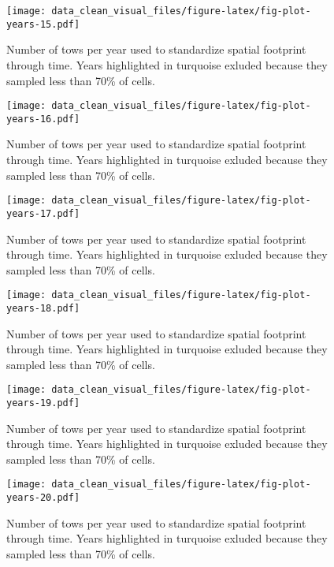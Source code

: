 \documentclass[
]{article}
\begin{document}
\begin{figure}
\centering
\texttt{[image: data\_clean\_visual\_files/figure-latex/fig-plot-years-15.pdf]}
\caption{\label{fig:fig-plot-years-15}Number of tows per year used to standardize spatial footprint through time. Years highlighted in turquoise exluded because they sampled less than 70\% of cells.}
\end{figure}

\begin{figure}
\centering
\texttt{[image: data\_clean\_visual\_files/figure-latex/fig-plot-years-16.pdf]}
\caption{\label{fig:fig-plot-years-16}Number of tows per year used to standardize spatial footprint through time. Years highlighted in turquoise exluded because they sampled less than 70\% of cells.}
\end{figure}

\begin{figure}
\centering
\texttt{[image: data\_clean\_visual\_files/figure-latex/fig-plot-years-17.pdf]}
\caption{\label{fig:fig-plot-years-17}Number of tows per year used to standardize spatial footprint through time. Years highlighted in turquoise exluded because they sampled less than 70\% of cells.}
\end{figure}

\begin{figure}
\centering
\texttt{[image: data\_clean\_visual\_files/figure-latex/fig-plot-years-18.pdf]}
\caption{\label{fig:fig-plot-years-18}Number of tows per year used to standardize spatial footprint through time. Years highlighted in turquoise exluded because they sampled less than 70\% of cells.}
\end{figure}

\begin{figure}
\centering
\texttt{[image: data\_clean\_visual\_files/figure-latex/fig-plot-years-19.pdf]}
\caption{\label{fig:fig-plot-years-19}Number of tows per year used to standardize spatial footprint through time. Years highlighted in turquoise exluded because they sampled less than 70\% of cells.}
\end{figure}

\begin{figure}
\centering
\texttt{[image: data\_clean\_visual\_files/figure-latex/fig-plot-years-20.pdf]}
\caption{\label{fig:fig-plot-years-20}Number of tows per year used to standardize spatial footprint through time. Years highlighted in turquoise exluded because they sampled less than 70\% of cells.}
\end{figure}
\end{document}
